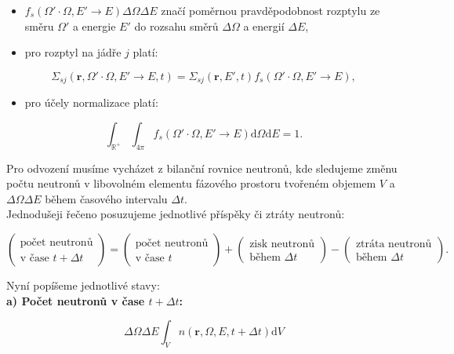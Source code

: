 \begin{itemize}
  \item $f_s(\Omega' \cdot \Omega, E' \rightarrow E) \Delta \Omega \Delta E$ značí poměrnou pravděpodobnost rozptylu ze směru $\Omega'$ a energie $E'$ do rozsahu směrů $\Delta \Omega$ a energií $\Delta E$,
  \item pro rozptyl na jádře $j$ platí:
\end{itemize}
$$\Sigma_{sj}(\textbf{r}, \Omega' \cdot \Omega, E' \rightarrow E, t) = \Sigma_{sj}(\textbf{r}, E', t) f_s(\Omega' \cdot \Omega, E' \rightarrow E), $$

\begin{itemize}
  \item pro účely normalizace platí:
\end{itemize}
$$\int_\mathbb{R^+} \int_{4 \pi} f_s(\Omega' \cdot \Omega, E' \rightarrow E) \text{d} \Omega \text{d}E = 1. $$


Pro odvození musíme vycházet z bilanční rovnice neutronů, kde sledujeme změnu počtu neutronů v libovolném elementu fázového prostoru tvořeném objemem $V$ a $\Delta \Omega \Delta E$ během časového intervalu $\Delta t$.\\

Jednodušeji řečeno posuzujeme jednotlivé příspěky či ztráty neutronů:

\begin{equation}
  \boxed{
  \begin{pmatrix} \text{počet neutronů} \\ \text{v čase } t + \Delta t \end{pmatrix} = \begin{pmatrix} \text{počet neutronů} \\ \text{v čase } t \end{pmatrix} + \begin{pmatrix} \text{zisk neutronů} \\ \text{během } \Delta t \end{pmatrix} - \begin{pmatrix} \text{ztráta neutronů} \\ \text{během } \Delta t \end{pmatrix}.
  \label{bilancni_rovnice}}
\end{equation}

Nyní popíšeme jednotlivé stavy:\\

\textbf{a) Počet neutronů v čase $t + \Delta t$:}

$$ \Delta \Omega \Delta E \int_V n(\textbf{r}, \Omega, E, t + \Delta t) \text{d}V $$

